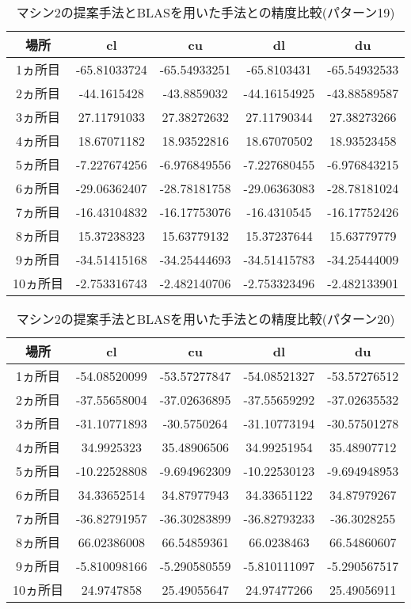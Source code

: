 \documentclass[11pt,a4paper]{jsreport}
\theoremstyle{definition}
\begin{document}
\begin{table}[H]
\centering
\begin{tabular}{|c|c|c|c|c|}
\hline
場所 & cl & cu & dl & du \\ \hline
1ヵ所目 & -65.81033724 & -65.54933251 & -65.8103431 & -65.54932533 \\ \hline
2ヵ所目 & -44.1615428 & -43.8859032 & -44.16154925 & -43.88589587 \\ \hline
3ヵ所目 & 27.11791033 & 27.38272632 & 27.11790344 & 27.38273266 \\ \hline
4ヵ所目 & 18.67071182 & 18.93522816 & 18.67070502 & 18.93523458 \\ \hline
5ヵ所目 & -7.227674256 & -6.976849556 & -7.227680455 & -6.976843215 \\ \hline
6ヵ所目 & -29.06362407 & -28.78181758 & -29.06363083 & -28.78181024 \\ \hline
7ヵ所目 & -16.43104832 & -16.17753076 & -16.4310545 & -16.17752426 \\ \hline
8ヵ所目 & 15.37238323 & 15.63779132 & 15.37237644 & 15.63779779 \\ \hline
9ヵ所目 & -34.51415168 & -34.25444693 & -34.51415783 & -34.25444009 \\ \hline
10ヵ所目 & -2.753316743 & -2.482140706 & -2.753323496 & -2.482133901 \\ \hline
\end{tabular}
\caption{マシン2の提案手法とBLASを用いた手法との精度比較(パターン19)}
\end{table}

\begin{table}[H]
\centering
\begin{tabular}{|c|c|c|c|c|}
\hline
場所 & cl & cu & dl & du \\ \hline
1ヵ所目 & -54.08520099 & -53.57277847 & -54.08521327 & -53.57276512 \\ \hline
2ヵ所目 & -37.55658004 & -37.02636895 & -37.55659292 & -37.02635532 \\ \hline
3ヵ所目 & -31.10771893 & -30.5750264 & -31.10773194 & -30.57501278 \\ \hline
4ヵ所目 & 34.9925323 & 35.48906506 & 34.99251954 & 35.48907712 \\ \hline
5ヵ所目 & -10.22528808 & -9.694962309 & -10.22530123 & -9.694948953 \\ \hline
6ヵ所目 & 34.33652514 & 34.87977943 & 34.33651122 & 34.87979267 \\ \hline
7ヵ所目 & -36.82791957 & -36.30283899 & -36.82793233 & -36.3028255 \\ \hline
8ヵ所目 & 66.02386008 & 66.54859361 & 66.0238463 & 66.54860607 \\ \hline
9ヵ所目 & -5.810098166 & -5.290580559 & -5.810111097 & -5.290567517 \\ \hline
10ヵ所目 & 24.9747858 & 25.49055647 & 24.97477266 & 25.49056911 \\ \hline
\end{tabular}
\caption{マシン2の提案手法とBLASを用いた手法との精度比較(パターン20)}
\end{table}
\end{document}
